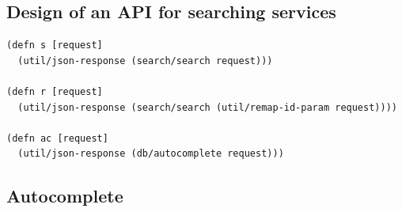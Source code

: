\subsection{Design of an API for searching services}\label{subsec:api-design}


\lstset{language=Clojure}
\begin{lstlisting}[label=lst:api-handlers,caption={%
      [API ring handler implementations]
      API ring handler implementations, taken from \texttt{api.clj}.}]
(defn s [request]
  (util/json-response (search/search request)))

(defn r [request]
  (util/json-response (search/search (util/remap-id-param request))))

(defn ac [request]
  (util/json-response (db/autocomplete request)))
\end{lstlisting}

\subsection{Autocomplete}\label{subsec:autocomplete}

